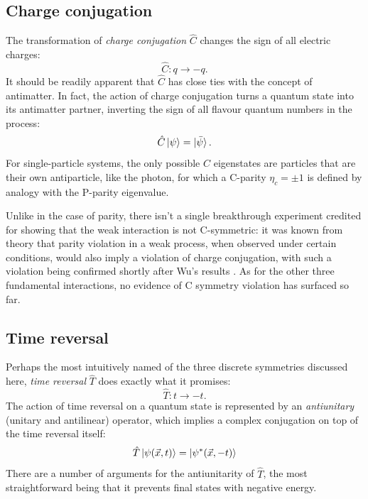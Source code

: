 \subsection{Charge conjugation}
\label{sec:C-symmetry}
The transformation of \textit{charge conjugation} $\hat{C}$ changes the sign of all electric charges:
\begin{equation}
	\hat{C} : q \rightarrow -q.
\end{equation}
It should be readily apparent that $\hat{C}$ has close ties with the concept of antimatter.
In fact, the action of charge conjugation turns a quantum state into its antimatter partner, inverting the sign of all flavour quantum numbers in the process:
\begin{equation}
	\hat{C} \ket{\psi} = \ket{\bar{\psi}}.
\end{equation}
For single-particle systems, the only possible $\hat{C}$ eigenstates are particles that are their own antiparticle, like the photon, for which a C-parity $\eta_c = \pm 1$ is defined by analogy with the P-parity eigenvalue.

Unlike in the case of parity, there isn't a single breakthrough experiment credited for showing that the weak interaction is not C-symmetric:
it was known from theory that parity violation in a weak process, when observed under certain conditions, would also imply a violation of charge conjugation, with such a violation being confirmed shortly after Wu's results \cite{cviolation}.
As for the other three fundamental interactions, no evidence of C symmetry violation has surfaced so far.

\subsection{Time reversal}
Perhaps the most intuitively named of the three discrete symmetries discussed here, \textit{time reversal} $\hat{T}$ does exactly what it promises:
\begin{equation}
	\hat{T} : t \rightarrow -t .
\end{equation}
The action of time reversal on a quantum state is represented by an \textit{antiunitary} (unitary and antilinear) operator, which implies a complex conjugation on top of the time reversal itself:
\begin{equation}
	\hat{T} \ket{\psi(\vec{x},t)} = \ket{\psi^*(\vec{x},-t)}
\end{equation}
There are a number of arguments for the antiunitarity of $\hat{T}$, the most straightforward being that it prevents final states with negative energy.

